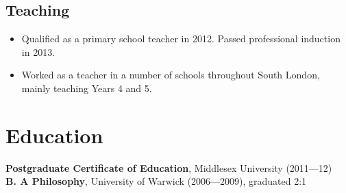 \documentclass[11pt,a4paper]{article}
\begin{document}
\subsection*{Teaching}
    \begin{itemize}
        \item Qualified as a primary school teacher in 2012. Passed professional induction in 2013.
        \item Worked as a teacher in a number of schools throughout South London, mainly teaching Years 4 and 5.
    \end{itemize}
\section*{Education}
\textbf{Postgraduate Certificate of Education}, Middlesex University (2011---12) \\
\textbf{B. A Philosophy}, University of Warwick (2006---2009), graduated 2:1
\end{document}
